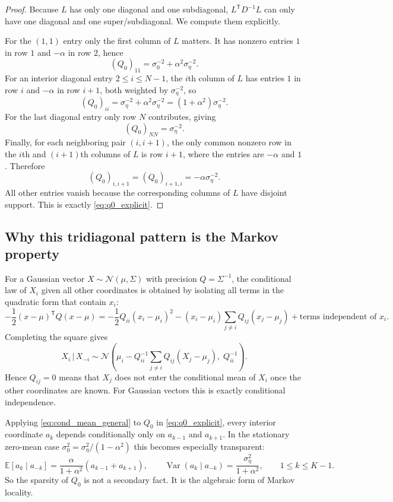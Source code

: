\documentclass[11pt]{article}
\newcommand{\E}{\mathbb{E}}
\newcommand{\Var}{\operatorname{Var}}
\newcommand{\trans}{\mathsf{T}}
\newcommand{\Ncal}{\mathcal{N}}
\begin{document}
\begin{proof}
Because $L$ has only one diagonal and one subdiagonal, $L^\trans D^{-1}L$ can only have one diagonal and one super/subdiagonal. We compute them explicitly.

For the $(1,1)$ entry only the first column of $L$ matters. It has nonzero entries $1$ in row $1$ and $-\alpha$ in row $2$, hence
\[
(Q_0)_{11}=\sigma_0^{-2}+\alpha^2\sigma_\eta^{-2}.
\]
For an interior diagonal entry $2\le i\le N-1$, the $i$th column of $L$ has entries $1$ in row $i$ and $-\alpha$ in row $i+1$, both weighted by $\sigma_\eta^{-2}$, so
\[
(Q_0)_{ii}=\sigma_\eta^{-2}+\alpha^2\sigma_\eta^{-2}=(1+\alpha^2)\sigma_\eta^{-2}.
\]
For the last diagonal entry only row $N$ contributes, giving
\[
(Q_0)_{NN}=\sigma_\eta^{-2}.
\]
Finally, for each neighboring pair $(i,i+1)$, the only common nonzero row in the $i$th and $(i+1)$th columns of $L$ is row $i+1$, where the entries are $-\alpha$ and $1$. Therefore
\[
(Q_0)_{i,i+1}=(Q_0)_{i+1,i}=-\alpha\sigma_\eta^{-2}.
\]
All other entries vanish because the corresponding columns of $L$ have disjoint support. This is exactly \eqref{eq:q0_explicit}.
\end{proof}

\subsection{Why this tridiagonal pattern is the Markov property}
For a Gaussian vector $X\sim\Ncal(\mu,\Sigma)$ with precision $Q=\Sigma^{-1}$, the conditional law of $X_i$ given all other coordinates is obtained by isolating all terms in the quadratic form that contain $x_i$:
\[
-\frac12 (x-\mu)^\trans Q(x-\mu)
= -\frac12 Q_{ii}(x_i-\mu_i)^2 - (x_i-\mu_i)\sum_{j\ne i}Q_{ij}(x_j-\mu_j) + \text{terms independent of }x_i.
\]
Completing the square gives
\begin{equation}\label{eq:cond_mean_general}
X_i\,\big|\,X_{-i}
\sim
\Ncal\!\left(
\mu_i-Q_{ii}^{-1}\sum_{j\ne i}Q_{ij}(X_j-\mu_j),
\;Q_{ii}^{-1}
\right).
\end{equation}
Hence $Q_{ij}=0$ means that $X_j$ does not enter the conditional mean of $X_i$ once the other coordinates are known. For Gaussian vectors this is exactly conditional independence.

Applying \eqref{eq:cond_mean_general} to $Q_0$ in \eqref{eq:q0_explicit}, every interior coordinate $a_k$ depends conditionally only on $a_{k-1}$ and $a_{k+1}$. In the stationary zero-mean case $\sigma_0^2=\sigma_\eta^2/(1-\alpha^2)$ this becomes especially transparent:
\begin{equation}\label{eq:cond_mean_stationary}
\E[a_k\mid a_{-k}]
=
\frac{\alpha}{1+\alpha^2}(a_{k-1}+a_{k+1}),
\qquad
\Var(a_k\mid a_{-k})=\frac{\sigma_\eta^2}{1+\alpha^2},
\qquad 1\le k\le K-1.
\end{equation}
So the sparsity of $Q_0$ is not a secondary fact. It is the algebraic form of Markov locality.
\end{document}
